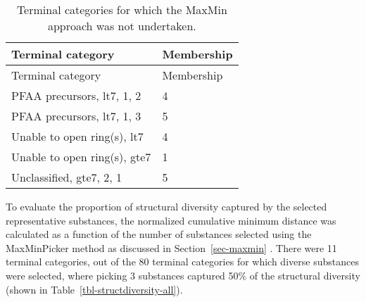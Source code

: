 \documentclass[
  super,
  preprint,
  3p]{elsarticle}
\begin{document}
\hypertarget{tbl-maxmin-cat}{}
\begin{longtable}[]{@{}ll@{}}
\caption{\label{tbl-maxmin-cat}Terminal categories for which the MaxMin
approach was not undertaken.}\tabularnewline
\toprule\noalign{}
Terminal category & Membership \\
\midrule\noalign{}
\endfirsthead
\toprule\noalign{}
Terminal category & Membership \\
\midrule\noalign{}
\endhead
\bottomrule\noalign{}
\endlastfoot
PFAA precursors, lt7, 1, 2 & 4 \\
PFAA precursors, lt7, 1, 3 & 5 \\
Unable to open ring(s), lt7 & 4 \\
Unable to open ring(s), gte7 & 1 \\
Unclassified, gte7, 2, 1 & 5 \\
\end{longtable}

To evaluate the proportion of structural diversity captured by the
selected representative substances, the normalized cumulative minimum
distance was calculated as a function of the number of substances
selected using the MaxMinPicker method as discussed in
Section~\ref{sec-maxmin} . There were 11 terminal categories, out of the
80 terminal categories for which diverse substances were selected, where
picking 3 substances captured 50\% of the structural diversity (shown in
Table~\ref{tbl-structdiversity-all}).
\end{document}
